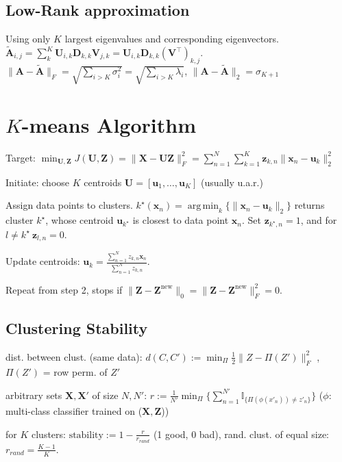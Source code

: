 \documentclass[a4paper, 11pt, landscape]{article}
\DeclareMathOperator*{\argmin}{arg\,min}
\begin{document}
\begin{multicols*}{3}
\subsection{Low-Rank approximation}
Using only $K$ largest eigenvalues and corresponding eigenvectors. $\tilde{\mathbf{A}}_{i, j} = \sum_{k}^K \mathbf{U}_{i, k} \mathbf{D}_{k,k} \mathbf{V}_{j, k} = \mathbf{U}_{i, k} \mathbf{D}_{k,k} (\mathbf{V}^\top)_{k, j}$.\\
	$\|\mathbf{A} - \tilde{\mathbf{A}}\|_F = \sqrt{\sum_{i > K} \sigma_i^2} = \sqrt{\sum_{i > K} \lambda_i}$,
	$\|\mathbf{A} - \tilde{\mathbf{A}}\|_2 = \sigma_{K+1}$

\section{$K$-means Algorithm}
\begin{inparadesc}
	\item[\color{red}Target:] $\min_{\mathbf{U}, \mathbf{Z}} J(\mathbf{U}, \mathbf{Z}) = \|\mathbf{X} - \mathbf{U} \mathbf{Z}\|_F^2 = \sum_{n=1}^N \sum_{k=1}^K \mathbf{z}_{k,n} \|\mathbf{x}_n - \mathbf{u}_k\|_2^2$
\end{inparadesc}
\begin{inparaenum}
	\item Initiate: choose $K$ centroids $\mathbf{U} = [\mathbf{u}_1, \ldots, \mathbf{u}_K]$ (usually u.a.r.)
	\item Assign data points to clusters. $k^\star(\mathbf{x}_n) = \argmin_k \{ \|\mathbf{x}_n - \mathbf{u}_k\|_2 \}$ returns cluster $k^\star$, whose centroid $\mathbf{u}_{k^\star}$ is closest to data point $\mathbf{x}_n$. Set $\mathbf{z}_{k^\star,n} = 1$, and for $ l \neq k^\star~ \mathbf{z}_{l,n}=0$.
	\item Update centroids: $\mathbf{u}_k = \frac{\sum_{n=1}^N z_{k,n} \mathbf{x}_n}{\sum_{n=1}^N z_{k,n}}$.
	\item Repeat from step 2, stops if $\|\mathbf{Z} - \mathbf{Z}^\text{new}\|_0 = \|\mathbf{Z} - \mathbf{Z}^\text{new}\|^2_F = 0$.
\end{inparaenum}

\subsection{Clustering Stability}
\begin{inparaitem}[\color{red}\textbullet]
  \item dist. between clust. (same data): $d(C,C') := \min_\Pi \frac{1}{2}\|Z-\Pi(Z')\|^2_F$ , $\Pi(Z
')$ = row perm. of $Z'$
  \item arbitrary sets $\mathbf{X},\mathbf{X'}$ of size $N,N'$: $r := \frac{1}{N'} \min_{\Pi} \{ \sum_{n=1}^{N'} \mathbb{I}_{\{\Pi(\phi(x'_n)) \neq z'_n\} } \}$ ($\phi$: multi-class classifier trained on ($\mathbf{X},\mathbf{Z}$))
  \item for $K$ clusters: $\text{stability} := 1 - \frac{r}{r_{rand}}$ (1 good, 0 bad), rand. clust. of equal size: $r_{rand} = \frac{K-1}{K}$.
\end{inparaitem}


\end{multicols*}
\end{document}
